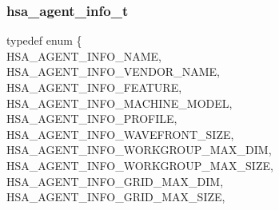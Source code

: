 \documentclass[final,oneside]{book}
\newcommand{\reftyp}[1]{#1}
\newcommand{\refenu}[1]{\reftyp{#1}}
\newenvironment{mylongtable}{\rowcolors{0}{lightgray}{lightgray}\longtable} {
\endlongtable}
\begin{document}
\subsubsection{hsa_\-agent_\-info_\-t}
\vspace{-5.5mm}\begin{mylongtable}{@{}p{\textwidth}}
\rule{0pt}{3ex}typedef enum \{\\\hspace{1.7em}\hypertarget{group__agentinfo_1gga39d0684207d95717d96319573b3e4a42a06b3ca6080e3bfd4d5b07db91d766e4c}{\refenu{HSA_\-AGENT_\-INFO_\-NAME}},\\
\hspace{1.7em}\hypertarget{group__agentinfo_1gga39d0684207d95717d96319573b3e4a42ac9e0c3d4f881d6de12ff8792eb92292c}{\refenu{HSA_\-AGENT_\-INFO_\-VENDOR_\-NAME}},\\
\hspace{1.7em}\hypertarget{group__agentinfo_1gga39d0684207d95717d96319573b3e4a42a4ce35a53f20e53b76c7cc7697f08ea04}{\refenu{HSA_\-AGENT_\-INFO_\-FEATURE}},\\
\hspace{1.7em}\hypertarget{group__agentinfo_1gga39d0684207d95717d96319573b3e4a42a5f62c238148161421e91c90552a39f46}{\refenu{HSA_\-AGENT_\-INFO_\-MACHINE_\-MODEL}},\\
\hspace{1.7em}\hypertarget{group__agentinfo_1gga39d0684207d95717d96319573b3e4a42acc8a260a87cb3fb811e29b8b13fabc4f}{\refenu{HSA_\-AGENT_\-INFO_\-PROFILE}},\\
\hspace{1.7em}\hypertarget{group__agentinfo_1gga39d0684207d95717d96319573b3e4a42a2474a5a57ecbf494156769f408ded8fd}{\refenu{HSA_\-AGENT_\-INFO_\-WAVEFRONT_\-SIZE}},\\
\hspace{1.7em}\hypertarget{group__agentinfo_1gga39d0684207d95717d96319573b3e4a42a595eea133327c6c6110c02a0661a06d6}{\refenu{HSA_\-AGENT_\-INFO_\-WORKGROUP_\-MAX_\-DIM}},\\
\hspace{1.7em}\hypertarget{group__agentinfo_1gga39d0684207d95717d96319573b3e4a42ade0ccd571bdc023d644d2337621e91f6}{\refenu{HSA_\-AGENT_\-INFO_\-WORKGROUP_\-MAX_\-SIZE}},\\
\hspace{1.7em}\hypertarget{group__agentinfo_1gga39d0684207d95717d96319573b3e4a42a512597f1fd2c2e6baee29f364ccd924f}{\refenu{HSA_\-AGENT_\-INFO_\-GRID_\-MAX_\-DIM}},\\
\hspace{1.7em}\hypertarget{group__agentinfo_1gga39d0684207d95717d96319573b3e4a42a16cd0e9d2e75ee3db1c22738b2cad8f6}{\refenu{HSA_\-AGENT_\-INFO_\-GRID_\-MAX_\-SIZE}},\\

\end{mylongtable}
\end{document}
